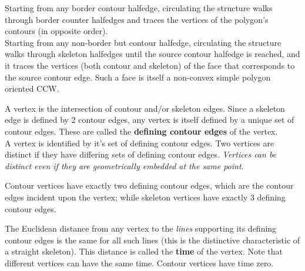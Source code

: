 Starting from any border contour halfedge, circulating the structure walks through border counter halfedges and traces the vertices of the polygon's contours (in opposite order).\\
Starting from any non-border but contour halfedge, circulating the structure walks through skeleton halfedges until the source contour halfedge is reached, and it traces the vertices (both contour and skeleton) of the face that corresponds to the source contour edge. Such a face is itself a non-convex simple polygon oriented CCW.

A vertex is the intersection of contour and/or skeleton edges. Since a skeleton edge is defined by 2 contour edges, any vertex is itself defined by a unique set of contour edges. These are called the \textbf{defining contour edges} of the vertex.\\
A vertex is identified by it's set of defining contour edges. Two vertices are distinct if they have differing sets of defining contour edges. \textit{Vertices can be distinct even if they are geometrically embedded at the same point}.
 
Contour vertices have exactly two defining contour edges, which are the contour edges incident upon the vertex; while skeleton vertices have exactly 3 defining contour edges.

The Euclidean distance from any vertex to the \textit{lines} supporting its defining contour edges is the same for all such lines (this is the distinctive characteristic of a straight skeleton). This distance is called the \textbf{time} of the vertex. Note that different vertices can have the same time. Contour vertices have time zero.

